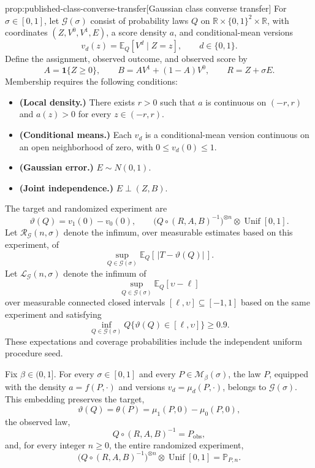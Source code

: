 \documentclass[11pt]{article}
\begin{document}
\begin{propositionv}{prop:published-class-converse-transfer}[Gaussian class converse transfer]
For \(\sigma\in[0,1]\), let \(\mathcal G(\sigma)\) consist of probability laws \(Q\) on \(\mathbb R\times\{0,1\}^2\times\mathbb R\), with coordinates \((Z,V^0,V^1,E)\), a score density \(a\), and conditional-mean versions
\[
v_d(z)=\mathbb E_Q[V^d\mid Z=z],\qquad d\in\{0,1\}.
\]
Define the assignment, observed outcome, and observed score by
\[
A=\mathbf 1\{Z\ge0\},\qquad
B=AV^1+(1-A)V^0,\qquad
R=Z+\sigma E.
\]
Membership requires the following conditions:
\begin{itemize}
\item \textbf{(Local density.)} There exists \(r>0\) such that \(a\) is continuous on \((-r,r)\) and \(a(z)>0\) for every \(z\in(-r,r)\).
\item \textbf{(Conditional means.)} Each \(v_d\) is a conditional-mean version continuous on an open neighborhood of zero, with \(0\le v_d(0)\le1\).
\item \textbf{(Gaussian error.)} \(E\sim N(0,1)\).
\item \textbf{(Joint independence.)} \(E\perp(Z,B)\).
\end{itemize}
The target and randomized experiment are
\[
\vartheta(Q)=v_1(0)-v_0(0),\qquad
\bigl(Q\circ(R,A,B)^{-1}\bigr)^{\otimes n}
 \otimes\operatorname{Unif}[0,1].
\]
Let \(\mathcal R_{\mathcal G}(n,\sigma)\) denote the infimum, over measurable estimates based on this experiment, of
\[
\sup_{Q\in\mathcal G(\sigma)}
\mathbb E_Q\!\left[\,|T-\vartheta(Q)|\,\right].
\]
Let \(\mathcal L_{\mathcal G}(n,\sigma)\) denote the infimum of
\[
\sup_{Q\in\mathcal G(\sigma)}
\mathbb E_Q[\upsilon-\ell]
\]
over measurable connected closed intervals \([\ell,\upsilon]\subseteq[-1,1]\) based on the same experiment and satisfying
\[
\inf_{Q\in\mathcal G(\sigma)}
Q\{\vartheta(Q)\in[\ell,\upsilon]\}\ge0.9.
\]
These expectations and coverage probabilities include the independent uniform procedure seed.

Fix \(\beta\in(0,1]\). For every \(\sigma\in[0,1]\) and every \(P\in\mathcal M_\beta(\sigma)\), the law \(P\), equipped with the density \(a=f(P,\cdot)\) and versions \(v_d=\mu_d(P,\cdot)\), belongs to \(\mathcal G(\sigma)\). This embedding preserves the target,
\[
\vartheta(Q)=\theta(P)
=\mu_1(P,0)-\mu_0(P,0),
\]
the observed law,
\[
Q\circ(R,A,B)^{-1}=P_{\mathrm{obs}},
\]
and, for every integer \(n\ge0\), the entire randomized experiment,
\[
\bigl(Q\circ(R,A,B)^{-1}\bigr)^{\otimes n}
 \otimes\operatorname{Unif}[0,1]
=\mathbb P_{P,n}.
\]


\end{propositionv}
\end{document}

